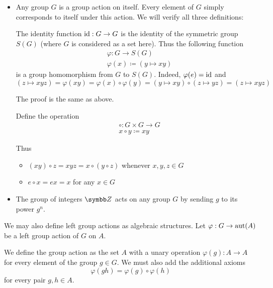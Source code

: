 \begin{Example}\label{ex:group_actions}
  \begin{itemize}\mbox{}
    \item Any group \( G \) is a group action on itself. Every element of \( G \) simply corresponds to itself under this action. We will verify all three definitions:
    \begin{RefList}
       The identity function \( \operatorname{id}: G \to G \) is the identity of the symmetric group \( S(G) \) (where \( G \) is considered as a set here). Thus the following function
      \begin{align*}
        &\varphi: G \to S(G) \\
        &\varphi(x) \coloneqq (y \mapsto xy)
      \end{align*}
      is a group homomorphism from \( G \) to \( S(G) \). Indeed, \( \varphi(e) = \operatorname{id} \) and
      \begin{equation*}
        (z \mapsto xyz) = \varphi(xy) = \varphi(x) \circ \varphi(y) = (y \mapsto xy) \circ (z \mapsto yz) = (z \mapsto xyz)
      \end{equation*}

       The proof is the same as above.

       Define the operation
      \begin{align*}
        &\circ: G \times G \to G \\
        &x \circ y \coloneqq xy
      \end{align*}

      Thus
      \begin{itemize}
        \item \( (x y) \circ z = xyz = x \circ (y \circ z) \) whenever \( x, y, z \in G \)
        \item \( e \circ x = ex = x \) for any \( x \in G \)
      \end{itemize}
    \end{RefList}

    \item The group of integers \( \BZ \) acts on any group \( G \) by sending \( g \) to its power \( g^n \).
  \end{itemize}
\end{Example}

\begin{Remark}\label{remark:left_group_actions_as_algebraic_structures}
  We may also define left group actions as algebraic structures. Let \( \varphi: G \to \operatorname{aut}(A) \) be a left group action of \( G \) on \( A \).

  We define the group action as the set \( A \) with a unary operation \( \varphi(g): A \to A \) for every element of the group \( g \in G \). We must also add the additional axioms
  \begin{equation*}
    \varphi(gh) = \varphi(g) \circ \varphi(h)
  \end{equation*}
  for every pair \( g, h \in A \).
\end{Remark}

